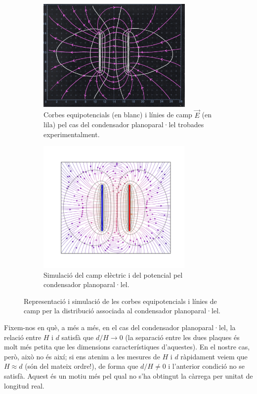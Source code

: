 \documentclass[a4paper,10.5pt]{report}
\begin{document}
\begin{figure}
	\centering
	\begin{subfigure}{0.45\linewidth}
		\centering
		\includegraphics[height=5.5cm]{dibplaques} %
		\caption{Corbes equipotencials (en blanc) i línies de camp $\vec{E}$ (en lila) pel cas del condensador planoparal·lel trobades experimentalment.}
		\label{fig:1.2a}
	\end{subfigure}
	\hfill
	\begin{subfigure}{0.53\linewidth}
		\centering
		\includegraphics[height=6.5cm]{figplaques1} %
		\caption{Simulació del camp elèctric i del potencial pel condensador planoparal·lel.}
		\label{fig:1.2b}
	\end{subfigure}
	\caption{Representació i simulació de les corbes equipotencials i línies de camp per la distribució associada al condensador planoparal·lel.}
	\label{fig:1.2}
\end{figure}

Fixem-nos en què, a més a més, en el cas del condensador planoparal·lel, la relació entre $H$ i $d$ satisfà que $d/H \rightarrow 0$ (la separació entre les dues plaques és molt més petita que les dimensions característiques d'aquestes). En el nostre cas, però, això no és així; si ens atenim a les mesures de $H$ i $d$ ràpidament veiem que $H\approx d$ (són del mateix ordre!), de forma que $d/H\neq 0$ i l'anterior condició no se satisfà. Aquest és un motiu més pel qual no s'ha obtingut la càrrega per unitat de longitud real.
\end{document}
